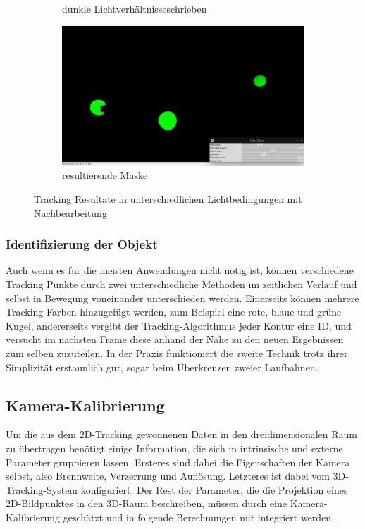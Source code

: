 \documentclass[12pt, ngerman]{article}
\begin{document}
\begin{figure}[htbp!]
\begin{subfigure}[t]{0.45\textwidth}
      \caption{dunkle Lichtverhältnisseschrieben}
      \label{Abb: 2d-color-dunkel}
  \end{subfigure}
  \hfill
  \vspace{10pt}
  \begin{subfigure}[t]{0.6\textwidth}
      \centering
      \includegraphics[width=\textwidth]{2d-color-filter.jpg}
      \caption{resultierende Maske}
      \label{Abb: 2d-color-maske}
  \end{subfigure}
  \caption{Tracking Resultate in unterschiedlichen Lichtbedingungen mit Nachbearbeitung}
  \label{Abb: Nachbearbeitungen}
\end{figure}

\subsubsection{Identifizierung der Objekt}
Auch wenn es für die meisten Anwendungen nicht nötig ist, können verschiedene Tracking Punkte durch zwei unterschiedliche Methoden im zeitlichen Verlauf und selbst in Bewegung voneinander unterschieden werden. Einerseits können mehrere Tracking-Farben hinzugefügt werden, zum Beispiel eine rote, blaue und grüne Kugel, andererseits vergibt der Tracking-Algorithmus jeder Kontur eine ID, und versucht im nächsten Frame diese anhand der Nähe zu den neuen Ergebnissen zum selben zuzuteilen. In der Praxis funktioniert die zweite Technik trotz ihrer Simplizität erstaunlich gut, sogar beim Überkreuzen zweier Laufbahnen.  

\subsection{Kamera-Kalibrierung}
Um die aus dem 2D-Tracking gewonnenen Daten in den dreidimensionalen Raum zu übertragen benötigt einige Information, die sich in intrinsische und externe Parameter gruppieren lassen. Ersteres sind dabei die Eigenschaften der Kamera selbst, also Brennweite, Verzerrung und Auflösung. Letzteres ist dabei vom 3D-Tracking-System konfiguriert. 
Der Rest der Parameter, die die Projektion eines 2D-Bildpunktes in den 3D-Raum beschreiben, müssen durch eine Kamera-Kalibrierung geschätzt und in folgende Berechnungen mit integriert werden. 
\end{document}
